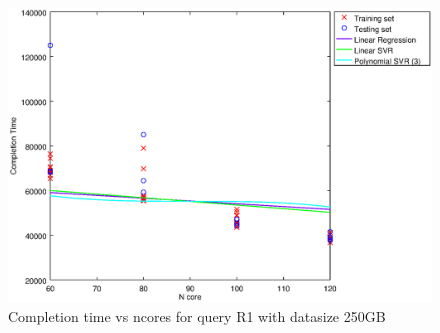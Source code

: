 
\begin {figure}[hbtp]
\centering
\includegraphics[width=\textwidth]{output/R1_250_LINEAR_NCORE/plot_R1_250_bestmodels.eps}
\caption{Completion time vs ncores for query R1 with datasize 250GB}
\label{fig:coreonly_linear_R1_250}
\end {figure}
